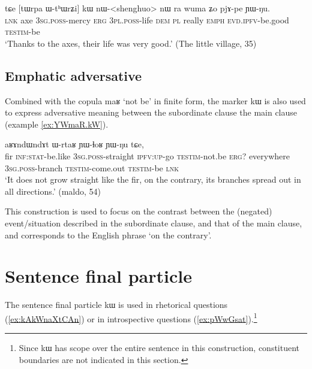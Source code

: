 \documentclass[oldfontcommands,oneside,a4paper,11pt]{article}
\newcommand{\ipa}[1]{{\phon #1}} %
\begin{document}
  \begin{exe}
\ex \label{ex:WthWrZi.kW}
\gll
\ipa{tɕe}  	[\ipa{tɯrpa}  	\ipa{ɯ-tʰɯrʑi}]  	\ipa{kɯ}  	\ipa{nɯ}-<shenghuo>  	\ipa{nɯ} \ipa{ra}  	\ipa{wuma}  	\ipa{ʑo}  	\ipa{pjɤ-pe}  	\ipa{ɲɯ-ŋu.}  \\
\textsc{lnk} axe \textsc{3sg.poss}-mercy \textsc{erg} \textsc{3pl.poss}-life \textsc{dem} \textsc{pl} really \textsc{emph} \textsc{evd.ipfv}-be.good \textsc{testim}-be \\
\glt `Thanks to the axes, their life was very good.' (The little village, 35)
  \end{exe}
  
  
 \subsection{Emphatic adversative} \label{sec:advers}
Combined with the copula \ipa{maʁ} `not be' in finite form, the marker \ipa{kɯ} is also used to express adversative meaning between the subordinate clause the main clause (example \ref{ex:YWmaR.kW}).
 
  \begin{exe} 
 \ex \label{ex:YWmaR.kW}
\gll [\ipa{tɯrgi} 	\ipa{kɯ-fse} 	\ipa{ɯ-stu} 	\ipa{tu-ɕe} 	\ipa{ɲɯ-maʁ}] 	\ipa{kɯ,} \ipa{aʁɤndɯndɤt} 	\ipa{ɯ-rtaʁ} 	\ipa{ɲɯ-ɬoʁ} 	\ipa{ɲɯ-ŋu} 	\ipa{tɕe,} 
\\
fir \textsc{inf:stat}-be.like \textsc{3sg.poss}-straight \textsc{ipfv:up}-go \textsc{testim}-not.be \textsc{erg}? everywhere \textsc{3sg.poss}-branch \textsc{testim}-come.out \textsc{testim}-be \textsc{lnk} \\ 
\glt `It does not grow straight like the fir, on the contrary, its branches spread out in all directions.'  
(maldo, 54)
 \end{exe}  
 
 This construction is used to focus on the contrast between the (negated) event/situation described in the subordinate clause, and that of the main clause, and corresponds to the English phrase `on the contrary'.
 
 \section{Sentence final particle} \label{sec:compl}
 
 
The sentence final particle \ipa{kɯ} is used in rhetorical questions (\ref{ex:kAkWnaXtCAn}) or in introspective questions (\ref{ex:pWwGsat}).\footnote{Since  \ipa{kɯ} has scope over the entire sentence in this construction,   constituent boundaries are not indicated in this section.  }
\end{document}
